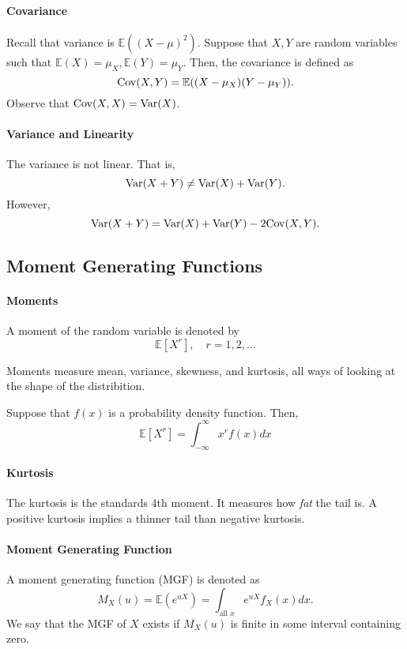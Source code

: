 \paragraph{Covariance}
Recall that variance is \(\mathbb{E}((X - \mu)^2)\).
Suppose that \(X, Y\) are random variables such that
\(\mathbb{E}(X) = \mu_X, \mathbb{E}(Y) = \mu_Y\).
Then, the covariance is defined as
\[
    \mathrm{Cov}(X, Y) =
    \mathbb{E}(
        (X - \mu_X)(Y - \mu_Y)
    ).
\]
Observe that \(\mathrm{Cov}(X, X) = \mathrm{Var}(X)\).

\paragraph{Variance and Linearity}
The variance is not linear. That is, \[
    \mathrm{Var}(X + Y) \neq \mathrm{Var}(X) + \mathrm{Var}(Y).
\]
However, \[
    \mathrm{Var}(X + Y) = \mathrm{Var}(X) + \mathrm{Var}(Y) - 2\mathrm{Cov}(X, Y).
\]

% 
% 
% 
\subsection{Moment Generating Functions}

\paragraph{Moments}
A moment of the random variable is denoted by
\[ 
    \mathbb{E}[X^r], \quad r = 1, 2, \dots
\]

Moments measure mean, variance, skewness, and kurtosis, all ways of
looking at the shape of the distribition.

Suppose that \(f(x)\) is a probability density function. Then,
\[
    \mathbb{E}[X^r] = \int_{-\infty}^{\infty} x^r f(x)dx
\]


\paragraph{Kurtosis}
The kurtosis is the standards 4th moment. It measures how \textit{fat}
the tail is. A positive kurtosis implies a thinner tail than negative
kurtosis.

\paragraph{Moment Generating Function}
A moment generating function (MGF) is denoted as
\[
    M_X (u) = \mathbb{E}(e^{uX})
    = \int_{\text{all } x} e^{uX} f_X(x)dx.
\]
We say that the MGF of \(X\) exists if \(M_X(u)\) is finite
in some interval containing zero.

